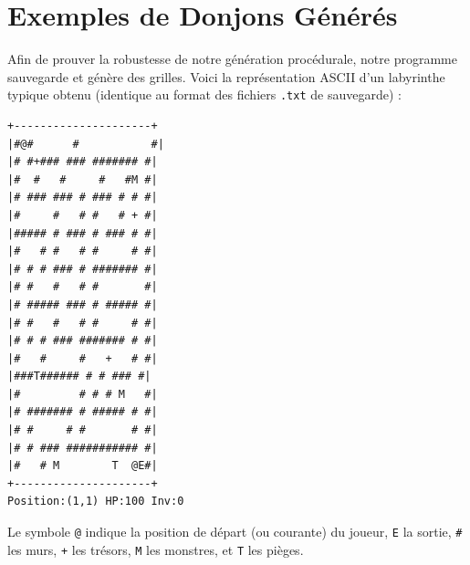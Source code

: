 \documentclass[11pt,a4paper]{article}
\begin{document}
\section{Exemples de Donjons Générés}
Afin de prouver la robustesse de notre génération procédurale, notre programme sauvegarde et génère des grilles. Voici la représentation ASCII d'un labyrinthe typique obtenu (identique au format des fichiers \texttt{.txt} de sauvegarde) :
\begin{verbatim}
+---------------------+
|#@#      #           #|
|# #+### ### ####### #|
|#  #   #     #   #M #|
|# ### ### # ### # # #|
|#     #   # #   # + #|
|##### # ### # ### # #|
|#   # #   # #     # #|
|# # # ### # ####### #|
|# #   #   # #       #|
|# ##### ### # ##### #|
|# #   #   # #     # #|
|# # # ### ####### # #|
|#   #     #   +   # #|
|###T###### # # ### #|
|#         # # # M   #|
|# ####### # ##### # #|
|# #     # #       # #|
|# # ### ########### #|
|#   # M        T  @E#|
+---------------------+
Position:(1,1) HP:100 Inv:0
\end{verbatim}
Le symbole \texttt{@} indique la position de départ (ou courante) du joueur, \texttt{E} la sortie, \texttt{\#} les murs, \texttt{+} les trésors, \texttt{M} les monstres, et \texttt{T} les pièges. 
\end{document}

